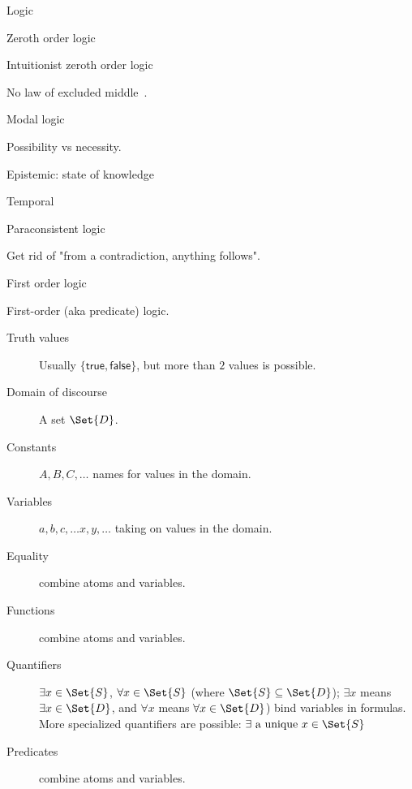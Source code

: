 \begin{plSection}{Logic}
\begin{plSection}{Zeroth order logic}
\begin{plSection}{Intuitionist zeroth order logic}

No law of excluded middle~.

\end{plSection}%
\end{plSection}%
\begin{plSection}{Modal logic}
\label{sec:Modal_logic}


Possibility vs necessity.

Epistemic: state of knowledge

Temporal 

\end{plSection}%
\begin{plSection}{Paraconsistent logic}
\label{sec:Paraconsistent_logic}


Get rid of "from a contradiction, anything follows".
\end{plSection}%
\begin{plSection}{First order logic}
\label{sec:First_order_logic}

First-order (aka predicate) logic.~

\begin{description}
\item[Truth values] Usually $\{\mathsf{true},\mathsf{false}\}$,
but more than $2$ values is possible.
\item[Domain of discourse] A set $\Set{D}$.
\item[Constants] $A,B,C, \ldots$ names for values in the
domain.
\item[Variables] $a,b,c, \ldots x,y,\dots$ taking on values in the
domain.~
\item[Equality] combine atoms and variables.
\item[Functions] combine atoms and variables.
\item[Quantifiers]   
$\exists x \in \Set{S}$, $\forall x \in \Set{S}$ 
(where $\Set{S} \subseteq \Set{D}$);
$\exists x$ means $\exists x \in \Set{D}$, 
and
$\forall x$ means $\forall x \in \Set{D}$) 
bind variables in
formulas.~
More specialized quantifiers are possible:
$\exists \textrm{ a unique } x \in \Set{S}$
\item[Predicates] combine atoms and variables.
\end{description} 


\end{plSection}
\end{plSection}
